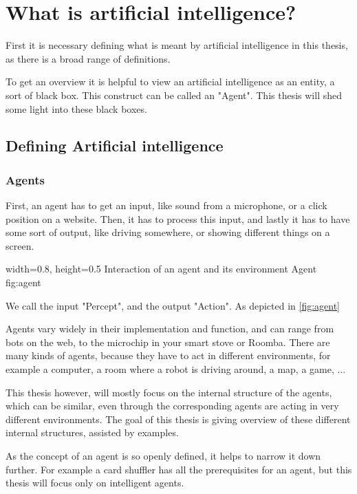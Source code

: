 \chapter{What is artificial intelligence?}
First it is necessary defining what is meant by artificial intelligence in this thesis, as there is a broad range of definitions.%

To get an overview it is helpful to view an artificial intelligence as an entity, a sort of black box. This construct can be called an "Agent". 
This thesis will shed some light into these black boxes.

\section{Defining Artificial intelligence}
\subsection{Agents}
First, an agent has to get an input, like sound from a microphone, or a click position on a website.
Then, it has to process this input, 
and lastly it has to have some sort of output, like driving somewhere, or showing different things on a screen.

    {width=0.8\textwidth, height=0.5\textheight} %
    {Interaction of an agent and its environment}   %
    {Agent}   %
    {fig:agent}    %

We call the input "Percept", and the output "Action". As depicted in \autoref{fig:agent}

Agents vary widely in their implementation and function, and can range from bots on the web, to the microchip in your smart stove or Roomba. 
There are many kinds of agents, because they have to act in different environments, for example a computer, a room where a robot is driving around, a map, a game, ...

This thesis however, will mostly focus on the internal structure of the agents, which can be similar, even through the corresponding agents are acting in very different environments.
The goal of this thesis is giving overview of these different internal structures, assisted by examples.

As the concept of an agent is so openly defined, it helps to narrow it down further. For example a card shuffler has all the prerequisites for an agent, but this thesis will focus only on intelligent agents.

